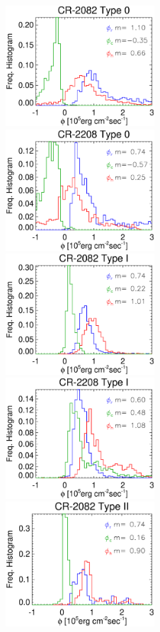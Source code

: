 \documentclass[namedreferences]{solarphysics}
\begin{document}
\begin{article}
\begin{figure}[h!]
\begin{center}
\includegraphics[width=0.495\textwidth]{figs/histocr2082_ccdownenergia.eps}
\includegraphics[width=0.495\textwidth]{figs/histocr2208_ccdownenergia.eps}
\includegraphics[width=0.495\textwidth]{figs/histocr2082_ccenergia.eps}
\includegraphics[width=0.495\textwidth]{figs/histocr2208_ccenergia.eps}
\includegraphics[width=0.495\textwidth]{figs/histocr2082_cgenergia.eps}

\end{center}
\end{figure}
\end{article}
\end{document}
